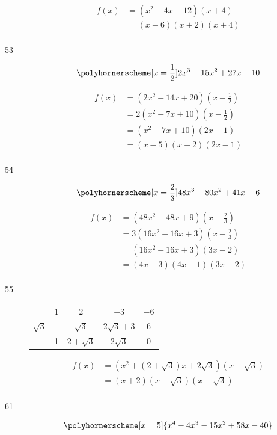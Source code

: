 \documentclass[fleqn,addpoints]{exam}
\begin{document}
\begin{description}
\begin{align*}
  f(x) &= (x^2 - 4x - 12)(x+4) \\
       &= (x-6)(x+2)(x+4) \\
\end{align*}

\item[53]
\[
  \polyhornerscheme[x=\frac{1}{2}]{2x^3-15x^2+27x-10} \\
\]

\begin{align*}
  f(x) &= (2x^2-14x+20) \left( x-\frac{1}{2} \right) \\
       &= 2(x^2-7x+10)  \left( x-\frac{1}{2} \right) \\
       &= (x^2-7x+10)(2x-1) \\
       &= (x-5)(x-2)(2x-1) \\
\end{align*}

\item[54]
\[
  \polyhornerscheme[x=\frac{2}{3}]{48x^3-80x^2+41x-6} \\
\]

\begin{align*}
  f(x) &= (48x^2-48x+9) \left(x-\frac{2}{3} \right) \\
       &= 3(16x^2-16x+3)\left (x-\frac{2}{3} \right) \\
       &= (16x^2-16x+3)(3x-2) \\
       &= (4x-3)(4x-1)(3x-2) \\
\end{align*}

\item[55]

\begin{tabular}{c|cccc}
             & 1 & 2              & $-3$            & $-6$ \\
  $\sqrt{3}$ &   & $\sqrt{3}$     & $2\sqrt{3} + 3$ & 6 \\
  \hline
             & 1 & $2 + \sqrt{3}$ & $2\sqrt{3}$     & 0 \\
\end{tabular}

\begin{align*}
  f(x) &= (x^2 + (2+\sqrt{3})x + 2\sqrt{3})(x-\sqrt{3}) \\
       &= (x + 2)(x + \sqrt{3})(x-\sqrt{3}) \\
\end{align*}

\item[61]
\[
  \polyhornerscheme[x=5]{x^4-4x^3-15x^2+58x-40} \\
\]


\end{description}
\end{document}
